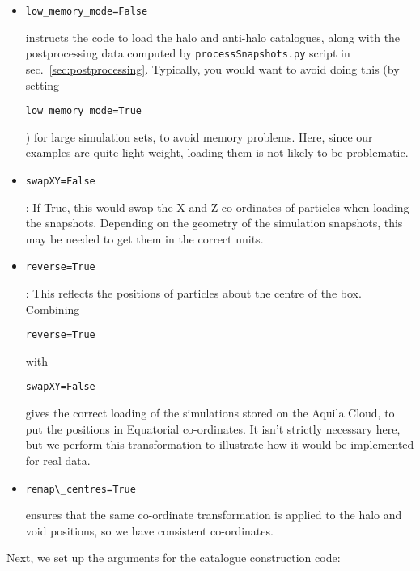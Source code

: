 \documentclass{article}
\newcommand{\codefont}[1]{{\texttt{#1}}}
\begin{document}
	\begin{itemize}
		\item \begin{verbatim}low_memory_mode=False\end{verbatim} instructs the code to load the halo and anti-halo catalogues, along with the postprocessing data computed by \codefont{processSnapshots.py} script in sec.~\ref{sec:postprocessing}. Typically, you would want to avoid doing this (by setting \begin{verbatim}low_memory_mode=True\end{verbatim}) for large simulation sets, to avoid memory problems. Here, since our examples are quite light-weight, loading them is not likely to be problematic.
		\item \begin{verbatim}swapXY=False\end{verbatim}: If True, this would swap the X and Z co-ordinates of particles when loading the snapshots. Depending on the geometry of the simulation snapshots, this may be needed to get them in the correct units.
		\item \begin{verbatim}reverse=True\end{verbatim}: This reflects the positions of particles about the centre of the box. Combining \begin{verbatim}reverse=True\end{verbatim} with \begin{verbatim}swapXY=False\end{verbatim} gives the correct loading of the simulations stored on the Aquila Cloud, to put the positions in Equatorial co-ordinates. It isn't strictly necessary here, but we perform this transformation to illustrate how it would be implemented for real data.
		\item \begin{verbatim}remap\_centres=True\end{verbatim} ensures that the same co-ordinate transformation is applied to the halo and void positions, so we have consistent co-ordinates.
	\end{itemize}
	
	Next, we set up the arguments for the catalogue construction code:
	
\end{document}
